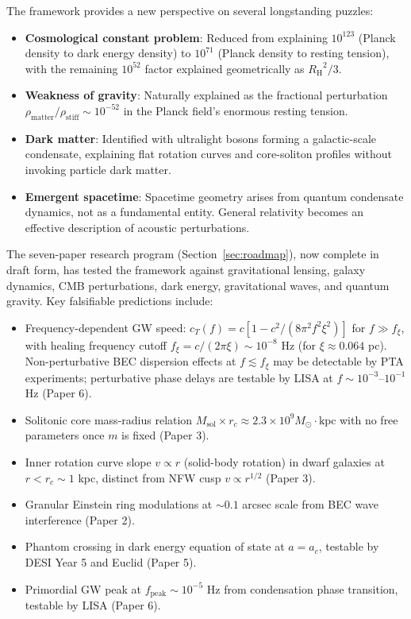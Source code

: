 \documentclass[11pt,a4paper]{article}
\newcommand{\rhostiff}{\ensuremath{\rho_{\mathrm{stiff}}}}
\newcommand{\RH}{\ensuremath{R_{\mathrm{H}}}}
\theoremstyle{definition}
\theoremstyle{remark}
\begin{document}
The framework provides a new perspective on several longstanding puzzles:

\begin{itemize}[leftmargin=*, itemsep=0.2em]
\item \textbf{Cosmological constant problem}: Reduced from explaining $10^{123}$ (Planck density to dark energy density) to $10^{71}$ (Planck density to resting tension), with the remaining $10^{52}$ factor explained geometrically as $\RH^2/3$.

\item \textbf{Weakness of gravity}: Naturally explained as the fractional perturbation $\rho_{\mathrm{matter}}/\rhostiff \sim 10^{-52}$ in the Planck field's enormous resting tension.

\item \textbf{Dark matter}: Identified with ultralight bosons forming a galactic-scale condensate, explaining flat rotation curves and core-soliton profiles without invoking particle dark matter.

\item \textbf{Emergent spacetime}: Spacetime geometry arises from quantum condensate dynamics, not as a fundamental entity. General relativity becomes an effective description of acoustic perturbations.
\end{itemize}

The seven-paper research program (Section~\ref{sec:roadmap}), now complete in draft form, has tested the framework against gravitational lensing, galaxy dynamics, CMB perturbations, dark energy, gravitational waves, and quantum gravity. Key falsifiable predictions include:

\begin{itemize}[leftmargin=*, itemsep=0.2em]
\item Frequency-dependent GW speed: $c_T(f) = c[1 - c^2/(8\pi^2 f^2 \xi^2)]$ for $f \gg f_\xi$, with healing frequency cutoff $f_\xi = c/(2\pi\xi) \sim 10^{-8}$ Hz (for $\xi \approx 0.064$ pc). Non-perturbative BEC dispersion effects at $f \lesssim f_\xi$ may be detectable by PTA experiments; perturbative phase delays are testable by LISA at $f \sim 10^{-3}$--$10^{-1}$ Hz (Paper 6).
\item Solitonic core mass-radius relation $M_{\mathrm{sol}} \times r_c \approx 2.3 \times 10^9 M_\odot \cdot \mathrm{kpc}$ with no free parameters once $m$ is fixed (Paper 3).
\item Inner rotation curve slope $v \propto r$ (solid-body rotation) in dwarf galaxies at $r < r_c \sim 1$ kpc, distinct from NFW cusp $v \propto r^{1/2}$ (Paper 3).
\item Granular Einstein ring modulations at $\sim 0.1$ arcsec scale from BEC wave interference (Paper 2).
\item Phantom crossing in dark energy equation of state at $a = a_c$, testable by DESI Year 5 and Euclid (Paper 5).
\item Primordial GW peak at $f_{\mathrm{peak}} \sim 10^{-5}$ Hz from condensation phase transition, testable by LISA (Paper 6).
\end{itemize}
\end{document}
